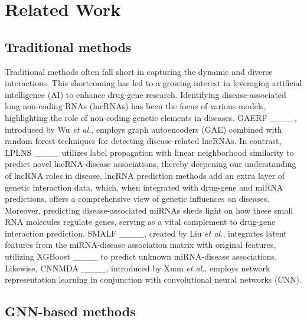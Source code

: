 \section{Related Work}
\label{sec: relatedwork}
\subsection{Traditional methods}

Traditional methods often fall short in capturing the dynamic and diverse interactions. This shortcoming has led to a growing interest in leveraging artificial intelligence (AI) to enhance drug-gene research. Identifying disease-associated long non-coding RNAs (lncRNAs) has been the focus of various models, highlighting the role of non-coding genetic elements in diseases. GAERF ____, introduced by Wu \textit{et al.}, employs graph autoencoders (GAE) combined with random forest techniques for detecting disease-related lncRNAs. In contrast, LPLNS ____ utilizes label propagation with linear neighborhood similarity to predict novel lncRNA-disease associations, thereby deepening our understanding of lncRNA roles in disease. lncRNA prediction methods add an extra layer of genetic interaction data, which, when integrated with drug-gene and miRNA predictions, offers a comprehensive view of genetic influences on diseases. Moreover, predicting disease-associated miRNAs sheds light on how these small RNA molecules regulate genes, serving as a vital complement to drug-gene interaction prediction. SMALF ____, created by Liu \textit{et al.}, integrates latent features from the miRNA-disease association matrix with original features, utilizing XGBoost ____ to predict unknown miRNA-disease associations. Likewise, CNNMDA ____, introduced by Xuan \textit{et al.}, employs network representation learning in conjunction with convolutional neural networks (CNN).
 
\subsection{GNN-based methods}


